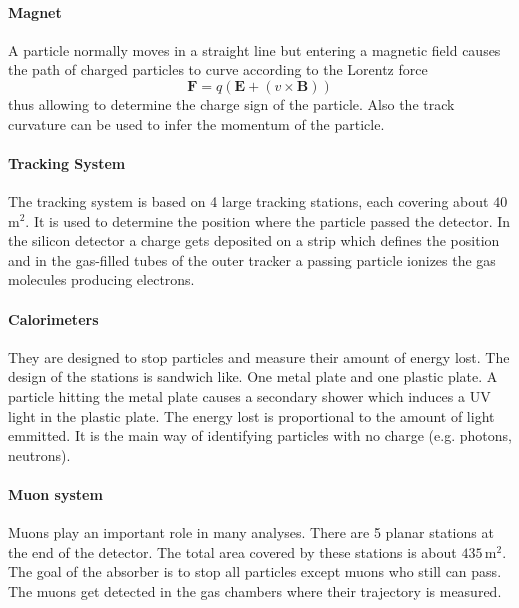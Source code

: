 \documentclass[11pt,twoside]{scrreprt}
\begin{document}
\paragraph{Magnet} A particle normally moves in a straight line but entering a magnetic field causes the path of charged particles to curve according to the Lorentz force \[
  \mathbf{F} = q\left( \mathbf{E} + \left( v\times\mathbf{B}\right)\right)
\]
thus allowing to determine the charge sign of the particle. Also the track curvature can be used to infer the momentum of the particle.

\paragraph{Tracking System} The tracking system is based on 4 large tracking stations, each covering about $40$\,m$^2$. It is used to determine the position where the particle passed the detector. In the silicon detector a charge gets deposited on a strip which defines the position and in the gas-filled tubes of the outer tracker a passing particle ionizes the gas molecules producing electrons.

\paragraph{Calorimeters} They are designed to stop particles and measure their amount of energy lost. The design of the stations is sandwich like. One metal plate and one plastic plate. A particle hitting the metal plate causes a secondary shower which induces a UV light in the plastic plate. The energy lost is proportional to the amount of light emmitted. It is the main way of identifying particles with no charge (e.g. photons, neutrons).

\paragraph{Muon system}
Muons play an important role in many analyses. There are 5 planar stations at the end of the detector. The total area covered by these stations is about $435$\,m$^2$.
The goal of the absorber is to stop all particles except muons who still can pass. The muons get detected in the gas chambers where their trajectory is measured.
\end{document}
